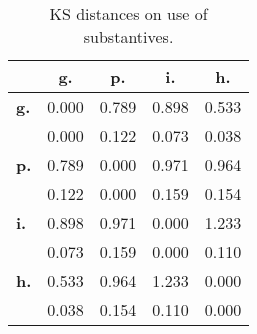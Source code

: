 \begin{table}[h!]
\begin{center}
\begin{tabular}{| l || c | c | c | c |}\hline
 & {\bf g.} & {\bf p.} & {\bf i.} & {\bf h.} \\\hline\hline
{\bf g.} & 0.000 & 0.789 & 0.898 & 0.533 \\
{\bf } & 0.000 & 0.122 & 0.073 & 0.038 \\\hline
{\bf p.} & 0.789 & 0.000 & 0.971 & 0.964 \\
{\bf } & 0.122 & 0.000 & 0.159 & 0.154 \\\hline
{\bf i.} & 0.898 & 0.971 & 0.000 & 1.233 \\
{\bf } & 0.073 & 0.159 & 0.000 & 0.110 \\\hline
{\bf h.} & 0.533 & 0.964 & 1.233 & 0.000 \\
{\bf } & 0.038 & 0.154 & 0.110 & 0.000 \\\hline
\end{tabular}
\caption{KS distances on use of substantives.}
\end{center}
\end{table}
